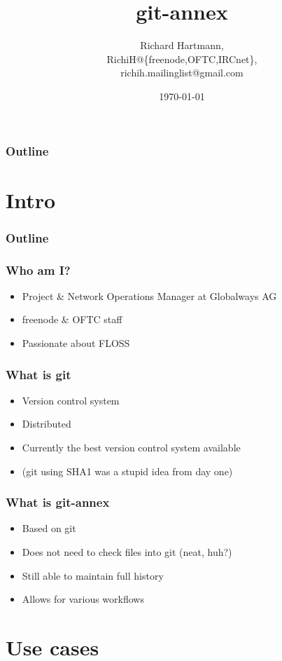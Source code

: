\documentclass[t]{beamer}
\title{git-annex}
\author{Richard Hartmann,\\
RichiH@\{freenode,OFTC,IRCnet\},\\
richih.mailinglist@gmail.com}
\date{\today}
\begin{document}
\begin{frame}
	\titlepage
\end{frame}

\begin{frame}
	\frametitle{Outline}
	\tableofcontents
\end{frame}


\section{Intro}

\begin{frame}
	\frametitle{Outline}
	\tableofcontents[currentsection]
\end{frame}

\begin{frame}
	\frametitle{Who am I?}
	\begin{itemize}
		\item Project \& Network Operations Manager at Globalways AG
		\item freenode \& OFTC staff
		\item Passionate about FLOSS
	\end{itemize}
\end{frame}

\begin{frame}
	\frametitle{What is git}
	\begin{itemize}
		\item Version control system
		\item Distributed
		\item Currently the best version control system available
		\item (git using SHA1 was a stupid idea from day one)
	\end{itemize}
\end{frame}

\begin{frame}
	\frametitle{What is git-annex}
	\begin{itemize}
		\item Based on git
		\item Does not need to check files into git (neat, huh?)
		\item Still able to maintain full history
		\item Allows for various workflows
	\end{itemize}
\end{frame}


\section{Use cases}
\end{document}
